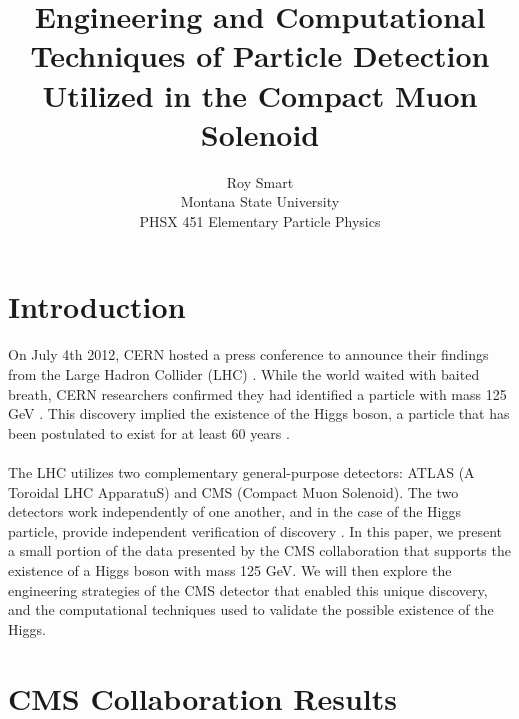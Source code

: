 \documentclass[12pt]{article}
\newcommand{\npar}{\\ \\ \noindent}
\begin{document}
\title{Engineering and Computational Techniques of Particle Detection Utilized in the Compact Muon Solenoid}
\author{Roy Smart \\ Montana State University \\PHSX 451 Elementary Particle Physics}
\maketitle

\section{Introduction}
On July 4th 2012, CERN hosted a press conference to announce their findings from the Large Hadron Collider (LHC) \cite{website:higgs_press}. While the world waited with baited breath, CERN researchers confirmed they had identified a particle with mass 125 GeV \cite{new_higgs}. This discovery implied the existence of the Higgs boson, a particle that has been postulated to exist for at least 60 years \cite{higgs_predict}. 
\npar
The LHC utilizes two complementary general-purpose detectors: ATLAS (A Toroidal LHC ApparatuS) and CMS (Compact Muon Solenoid). The two detectors work independently of one another, and in the case of the Higgs particle, provide independent verification of discovery \cite{lhc_combo}. In this paper, we present a small portion of the data presented by the CMS collaboration that supports the existence of a Higgs boson with mass 125 GeV. We will then explore the engineering strategies of the CMS detector that enabled this unique discovery, and the computational techniques used to validate the possible existence of the Higgs.


\section{CMS Collaboration Results}
\end{document}
